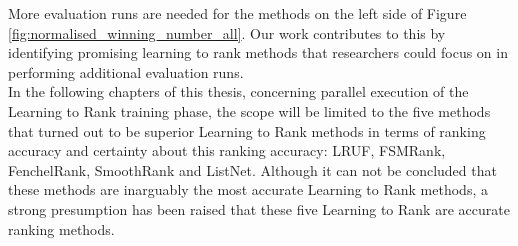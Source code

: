 More evaluation runs are needed for the methods on the left side of Figure \ref{fig:normalised_winning_number_all}. Our work contributes to this by identifying promising learning to rank methods that researchers could focus on in performing additional evaluation runs.\\

In the following chapters of this thesis, concerning parallel execution of the Learning to Rank training phase, the scope will be limited to the five methods that turned out to be superior Learning to Rank methods in terms of ranking accuracy and certainty about this ranking accuracy: LRUF, FSMRank, FenchelRank, SmoothRank and ListNet. Although it can not be concluded that these methods are inarguably the most accurate Learning to Rank methods, a strong presumption has been raised that these five Learning to Rank are accurate ranking methods.\\